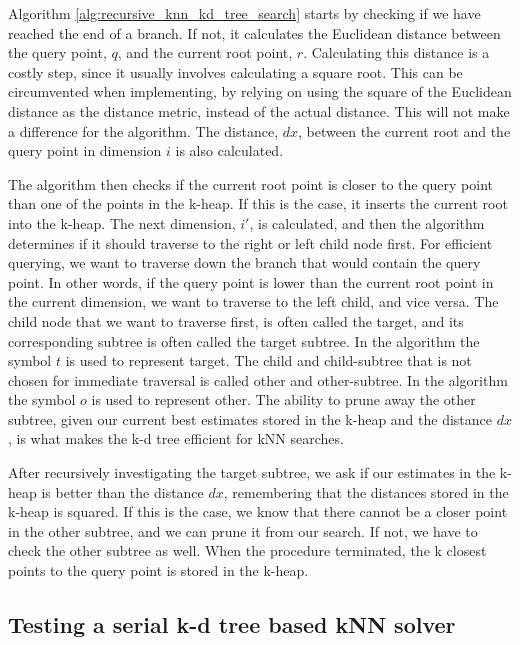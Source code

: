 Algorithm \ref{alg:recursive_knn_kd_tree_search} starts by checking if we have reached the end of a branch. If not, it calculates the Euclidean distance between the query point, $q$, and the current root point, $r$. Calculating this distance is a costly step, since it usually involves calculating a square root. This can be circumvented when implementing, by relying on using the square of the Euclidean distance as the distance metric, instead of the actual distance. This will not make a difference for the algorithm. The distance, $dx$, between the current root and the query point in dimension $i$ is also calculated.

The algorithm then checks if the current root point is closer to the query point than one of the points in the k-heap. If this is the case, it inserts the current root into the k-heap. The next dimension, $i'$, is calculated, and then the algorithm determines if it should traverse to the right or left child node first. For efficient querying, we want to traverse down the branch that would contain the query point. In other words, if the query point is lower than the current root point in the current dimension, we want to traverse to the left child, and vice versa. The child node that we want to traverse first, is often called the target, and its corresponding subtree is often called the target subtree. In the algorithm the symbol $t$ is used to represent target. The child and child-subtree that is not chosen for immediate traversal is called other and other-subtree. In the algorithm the symbol $o$ is used to represent other. The ability to prune away the other subtree, given our current best estimates stored in the k-heap and the distance $dx$, is what makes the k-d tree efficient for kNN searches.

After recursively investigating the target subtree, we ask if our estimates in the k-heap is better than the distance $dx$, remembering that the distances stored in the k-heap is squared. If this is the case, we know that there cannot be a closer point in the other subtree, and we can prune it from our search. If not, we have to check the other subtree as well. When the procedure terminated, the k closest points to the query point is stored in the k-heap.

\subsection{Testing a serial k-d tree based kNN solver} %
\label{sub:testing_a_serial_k_d_tree_based_knn_solver}

